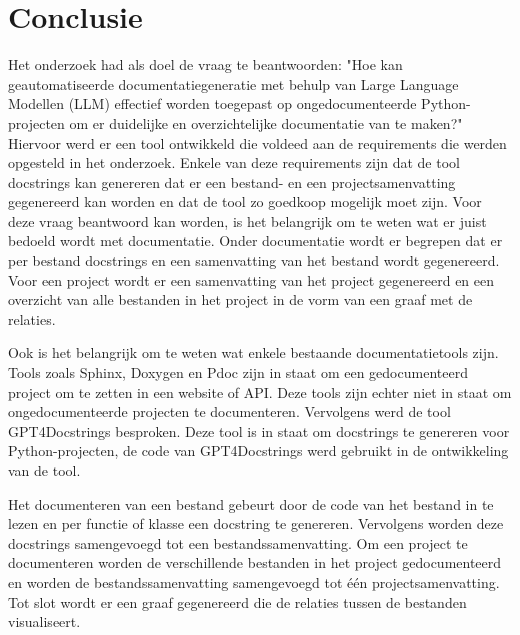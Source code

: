 
\chapter{Conclusie}%
\label{ch:conclusie}


Het onderzoek had als doel de vraag te beantwoorden: "Hoe kan geautomatiseerde documentatiegeneratie met behulp van Large Language Modellen (LLM) effectief worden toegepast op ongedocumenteerde Python-projecten om er duidelijke en overzichtelijke documentatie van te maken?"
Hiervoor werd er een tool ontwikkeld die voldeed aan de requirements die werden opgesteld in het onderzoek.
Enkele van deze requirements zijn dat de tool docstrings kan genereren dat er een bestand- en een projectsamenvatting gegenereerd kan worden en dat de tool zo goedkoop mogelijk moet zijn.
Voor deze vraag beantwoord kan worden, is het belangrijk om te weten wat er juist bedoeld wordt met documentatie.
Onder documentatie wordt er begrepen dat er per bestand docstrings en een samenvatting van het bestand wordt gegenereerd.
Voor een project wordt er een samenvatting van het project gegenereerd en een overzicht van alle bestanden in het project in de vorm van een graaf met de relaties.

Ook is het belangrijk om te weten wat enkele bestaande documentatietools zijn.
Tools zoals Sphinx, Doxygen en Pdoc zijn in staat om een gedocumenteerd project om te zetten in een website of API.
Deze tools zijn echter niet in staat om ongedocumenteerde projecten te documenteren.
Vervolgens werd de tool GPT4Docstrings besproken. Deze tool is in staat om docstrings te genereren voor Python-projecten, de code van GPT4Docstrings werd gebruikt in de ontwikkeling van de tool.

Het documenteren van een bestand gebeurt door de code van het bestand in te lezen en per functie of klasse een docstring te genereren.
Vervolgens worden deze docstrings samengevoegd tot een bestandssamenvatting.
Om een project te documenteren worden de verschillende bestanden in het project gedocumenteerd en worden de bestandssamenvatting samengevoegd tot één projectsamenvatting.
Tot slot wordt er een graaf gegenereerd die de relaties tussen de bestanden visualiseert.

